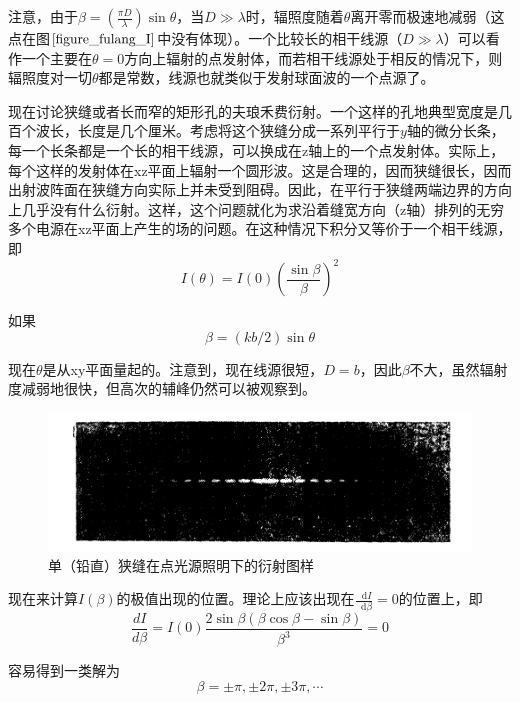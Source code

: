 \documentclass[UTF8]{ctexart}
\newcommand*{\dif}{\mathop{}\!\mathrm{d}}
\begin{document}
\noindent 注意，由于$ \beta=\left(\frac{\pi D}{\lambda}\right) \sin \theta $，当$ D\gg \lambda $时，辐照度随着$ \theta $离开零而极速地减弱（这点在图$ \ref{figure_fulang_I} $中没有体现）。一个比较长的相干线源（$ D \gg \lambda $）可以看作一个主要在$ \theta=0 $方向上辐射的点发射体，而若相干线源处于相反的情况下，则辐照度对一切$ \theta $都是常数，线源也就类似于发射球面波的一个点源了。

	现在讨论狭缝或者长而窄的矩形孔的夫琅禾费衍射。一个这样的孔地典型宽度是几百个波长，长度是几个厘米。考虑将这个狭缝分成一系列平行于$ y $轴的微分长条，每一个长条都是一个长的相干线源，可以换成在z轴上的一个点发射体。实际上，每个这样的发射体在xz平面上辐射一个圆形波。这是合理的，因而狭缝很长，因而出射波阵面在狭缝方向实际上并未受到阻碍。因此，在平行于狭缝两端边界的方向上几乎没有什么衍射。这样，这个问题就化为求沿着缝宽方向（z轴）排列的无穷多个电源在xz平面上产生的场的问题。在这种情况下积分又等价于一个相干线源，即
	\begin{equation}
	I(\theta)=I(0)\left(\frac{\sin \beta}{\beta}\right)^{2}
	\end{equation}
	
\noindent 如果
\begin{equation}
\beta=(k b / 2) \sin \theta
\end{equation}

\noindent 现在$ \theta $是从xy平面量起的。注意到，现在线源很短，$ D=b $，因此$ \beta $不大，虽然辐射度减弱地很快，但高次的辅峰仍然可以被观察到。
\begin{figure}[ht]
	\centering
	\includegraphics[width=12cm]{Diffraction_xiafeng.png}
	\caption{单（铅直）狭缝在点光源照明下的衍射图样}
	\label{figure_xiafeng}
\end{figure}

	现在来计算$ I(\beta) $的极值出现的位置。理论上应该出现在$ \frac{\dif I}{\dif \beta}=0 $的位置上，即
	\begin{equation}
	\frac{d I}{d \beta}=I(0) \frac{2 \sin \beta(\beta \cos \beta-\sin \beta)}{\beta^{3}}=0
	\end{equation}
	
\noindent 容易得到一类解为
\begin{equation}
\beta=\pm \pi, \pm 2 \pi, \pm 3 \pi, \cdots
\end{equation}
\end{document}
